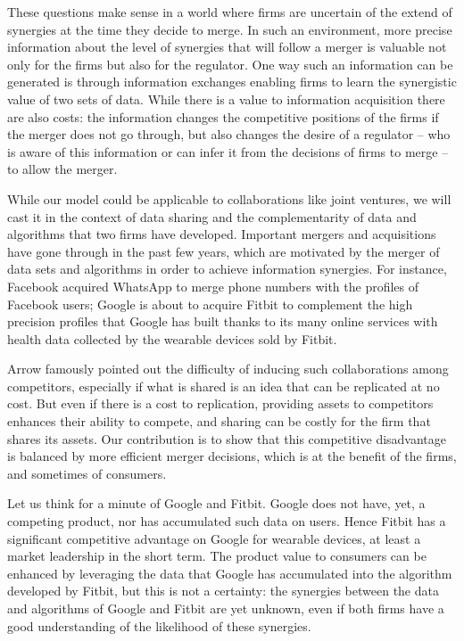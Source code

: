 \documentclass[a4paper,leqno]{article}%
\begin{document}
These questions make sense in a world where firms are uncertain of the extend of synergies at the time they decide to merge. In such an environment, more precise information about the level of synergies that will follow a merger is valuable not only for the firms but also for the regulator. One way such an information can be generated is through information exchanges enabling firms to learn the synergistic value of two sets of data. While there is a value to information acquisition there are also costs: the information changes the competitive positions of the firms if the merger does not go through, but also changes the desire of a regulator -- who is aware of this information or can infer it from the decisions of firms to merge -- to allow the merger.

While our model could be applicable to collaborations like joint ventures, we will cast it in the context of data sharing and the complementarity of data and algorithms that two firms have developed. Important mergers and acquisitions have gone through in the past few years, which are motivated by the merger of data sets and algorithms in order to achieve information synergies. For instance, Facebook acquired WhatsApp to merge phone numbers with the profiles of Facebook users; Google is about to acquire Fitbit to complement the high precision profiles that Google has built thanks to its many online services with health data collected by the wearable devices sold by Fitbit.

Arrow famously pointed out the difficulty of inducing such collaborations among competitors, especially if what is shared is an idea that can be replicated at no cost. But even if there is a cost to replication, providing assets to competitors enhances their ability to compete, and sharing can be costly for the firm that shares its assets. Our contribution is to show that this competitive disadvantage is balanced by more efficient merger decisions, which is at the benefit of the firms, and sometimes of consumers.

Let us think for a minute of Google and Fitbit. Google does not have, yet, a competing product, nor has accumulated such data on users. Hence Fitbit has a significant competitive advantage on Google for wearable devices, at least a market leadership in the short term. The product value to consumers can be enhanced by leveraging the data that Google has accumulated into the algorithm developed by Fitbit, but this is not a certainty: the synergies between the data and algorithms of Google and Fitbit are yet unknown, even if both firms have a good understanding of the likelihood of these synergies. 
\end{document}
